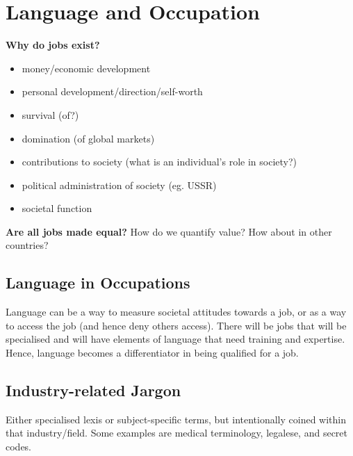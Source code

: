 \documentclass[../main.tex]{subfiles}
\begin{document}
\section{Language and Occupation}

\textbf{Why do jobs exist?}
\begin{itemize}
	\item money/economic development
	\item personal development/direction/self-worth
	\item survival (of?)
	\item domination (of global markets)
	\item contributions to society (what is an individual's role in society?)
	\item political administration of society (eg. USSR)
	\item societal function
\end{itemize}

\textbf{Are all jobs made equal?} How do we quantify value? How about in other countries? 


\subsection{Language in Occupations}
Language can be a way to measure societal attitudes towards a job, or as a way to access the job (and hence deny others access). There will be jobs that will be specialised and will have elements of language that need training and expertise. Hence, language becomes a differentiator in being qualified for a job.

\subsection{Industry-related Jargon}
Either specialised lexis or subject-specific terms, but intentionally coined within that industry/field. Some examples are medical terminology, legalese, and secret codes.
\end{document}
